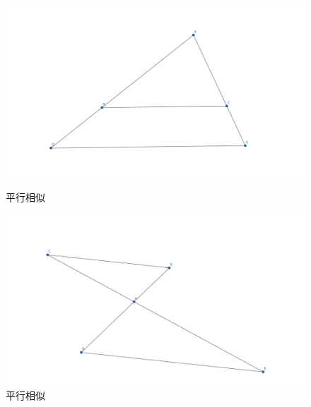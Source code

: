 \begin{figure}[h]
    \centering
    \hfill %
    \begin{minipage}[t]{0.45\textwidth}
    \centering
    \includegraphics[width=0.8\linewidth]{figures/平行相似.png}
    \caption{平行相似}
    \end{minipage}
    \hfill %
    \begin{minipage}[t]{0.45\textwidth}
    \centering
    \includegraphics[width=0.8\linewidth]{figures/平行相似2.png}
    \caption{平行相似}
    \end{minipage}
\end{figure}

